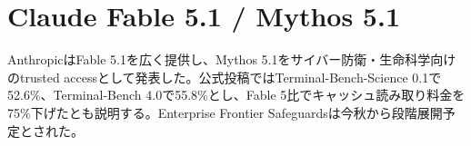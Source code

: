 \section{Claude Fable 5.1 / Mythos 5.1}
AnthropicはFable 5.1を広く提供し、Mythos 5.1をサイバー防衛・生命科学向けのtrusted accessとして発表した。公式投稿ではTerminal-Bench-Science 0.1で52.6\%、Terminal-Bench 4.0で55.8\%とし、Fable 5比でキャッシュ読み取り料金を75\%下げたとも説明する。Enterprise Frontier Safeguardsは今秋から段階展開予定とされた。

